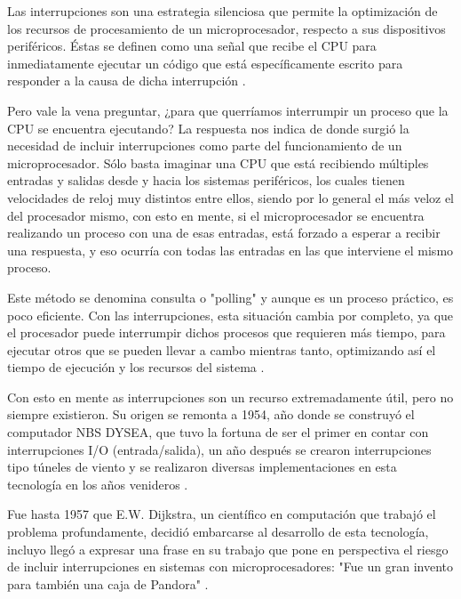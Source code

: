 \documentclass[12pt,a4paper]{report}
\begin{document}
    \vspace{1cm}
       Las interrupciones son una estrategia silenciosa que permite la optimización de los recursos de procesamiento de un microprocesador, respecto a sus dispositivos periféricos. Éstas se definen como una señal que recibe el CPU para inmediatamente ejecutar un código que está específicamente escrito para responder a la causa de dicha interrupción \cite{Mike Silva 2013}.
   
   \vspace{1cm}
   
       Pero vale la vena preguntar, ¿para que querríamos interrumpir un proceso que la CPU se encuentra ejecutando? La respuesta nos indica de donde surgió la necesidad de incluir interrupciones como parte del funcionamiento de un microprocesador. Sólo basta imaginar una CPU que está recibiendo múltiples entradas y salidas desde y hacia los sistemas periféricos, los cuales tienen velocidades de reloj muy distintos entre ellos, siendo por lo general el más veloz el del procesador mismo, con esto en mente, si el microprocesador se encuentra realizando un proceso con una de esas entradas, está forzado a esperar a recibir una respuesta, y eso ocurría con todas las entradas en las que interviene el mismo proceso. 
       
   \vspace{1cm}
       
       Este método se denomina consulta o "polling" y aunque es un proceso práctico, es poco eficiente. Con las interrupciones, esta situación cambia por completo, ya que el procesador puede interrumpir dichos procesos que requieren más tiempo, para ejecutar otros que se pueden llevar a cambo mientras tanto, optimizando así el tiempo de ejecución y los recursos del sistema \cite{Mike Silva 2013}.
       
       
   \vspace{1cm}
   
      Con esto en mente as interrupciones son un recurso extremadamente útil, pero no siempre existieron. Su origen se remonta a 1954, año donde se construyó el computador NBS DYSEA, que tuvo la fortuna de ser el primer en contar con interrupciones I/O (entrada/salida), un año después se crearon interrupciones tipo túneles de viento y se realizaron diversas implementaciones en esta tecnología en los años venideros \cite{Irfan Ahmad 2014}. 
      
   \vspace{1cm}   
   
      Fue hasta 1957 que E.W. Dijkstra, un científico en computación que trabajó el problema profundamente, decidió embarcarse al desarrollo de esta tecnología, incluyo llegó a expresar una frase en su trabajo que pone en perspectiva el riesgo de incluir interrupciones en sistemas con microprocesadores: "Fue un gran invento para también una caja de Pandora" \cite{Irfan Ahmad 2014}.
      
\end{document}

